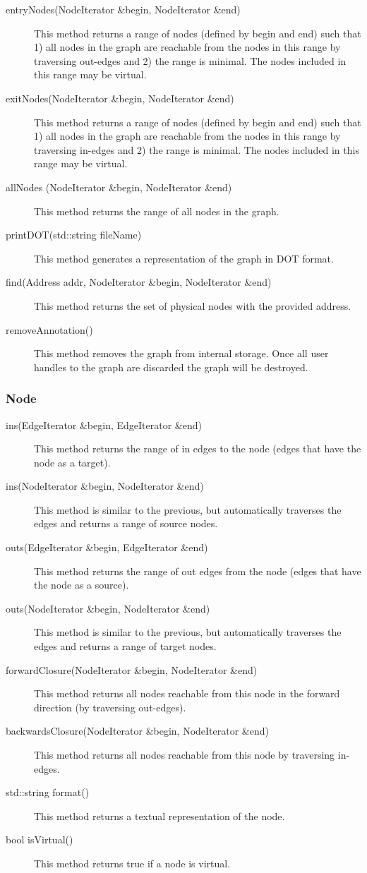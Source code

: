 \documentclass[12pt,titlepage]{article}
\begin{document}
\begin{description}

\item[entryNodes(NodeIterator \&begin, NodeIterator \&end)] This method returns a range of nodes (defined by begin and end) such that 1) all nodes in the graph are reachable from the nodes in this range by traversing out-edges and 2) the range is minimal. The nodes included in this range may be virtual. 
\item[exitNodes(NodeIterator \&begin, NodeIterator \&end)]
This method returns a range of nodes (defined by begin and end) such that 1) all nodes in the graph are reachable from the nodes in this range by traversing in-edges and 2) the range is minimal. The nodes included in this range may be virtual.
\item[allNodes (NodeIterator \&begin, NodeIterator \&end)]
This method returns the range of all nodes in the graph.
\item[printDOT(std::string fileName)]
This method generates a representation of the graph in DOT format.
\item[find(Address addr, NodeIterator \&begin, NodeIterator \&end)]
This method returns the set of physical nodes with the provided address. 
\item[removeAnnotation()]
This method removes the graph from internal storage. Once all user handles to the graph are discarded the graph will be destroyed.
\end{description}

\subsubsection{Node}

\begin{description}
\item[ins(EdgeIterator \&begin, EdgeIterator \&end)]
This method returns the range of in edges to the node (edges that have the node as a target). 
\item[ins(NodeIterator \&begin, NodeIterator \&end)]
This method is similar to the previous, but automatically traverses the edges and returns a range of source nodes. 
\item[outs(EdgeIterator \&begin, EdgeIterator \&end)]
This method returns the range of out edges from the node (edges that have the node as a source). 
\item[outs(NodeIterator \&begin, NodeIterator \&end)]
This method is similar to the previous, but automatically traverses the edges and returns a range of target nodes.
\item[forwardClosure(NodeIterator \&begin, NodeIterator \&end)]
This method returns all nodes reachable from this node in the forward direction (by traversing out-edges).
\item[backwardsClosure(NodeIterator \&begin, NodeIterator \&end)]
This method returns all nodes reachable from this node by traversing in-edges.
\item[std::string format()]
This method returns a textual representation of the node.
\item[bool isVirtual() ]
This method returns true if a node is virtual.
\end{description}
\end{document}
